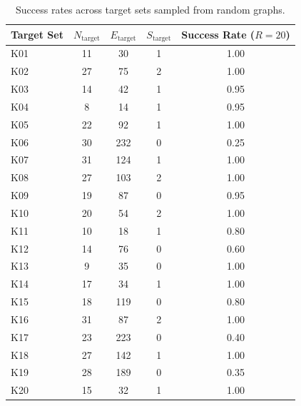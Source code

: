 \begin{table}[ht]
\centering
\caption{Success rates across target sets sampled from random graphs.}
\label{tab:success_rates}
\begin{tabular}{lccc|c}
\toprule
\textbf{Target Set} & \(N_{\text{target}}\) & \(E_{\text{target}}\) & \(S_{\text{target}}\) & \textbf{Success Rate (\(R=20\))} \\
\midrule
K01 & 11 & 30 & 1 & 1.00 \\
K02 & 27 & 75 & 2 & 1.00 \\
K03 & 14 & 42 & 1 & 0.95 \\
K04 & 8 & 14 & 1 & 0.95 \\
K05 & 22 & 92 & 1 & 1.00 \\
K06 & 30 & 232 & 0 & 0.25 \\
K07 & 31 & 124 & 1 & 1.00 \\
K08 & 27 & 103 & 2 & 1.00 \\
K09 & 19 & 87 & 0 & 0.95 \\
K10 & 20 & 54 & 2 & 1.00 \\
K11 & 10 & 18 & 1 & 0.80 \\
K12 & 14 & 76 & 0 & 0.60 \\
K13 & 9 & 35 & 0 & 1.00 \\
K14 & 17 & 34 & 1 & 1.00 \\
K15 & 18 & 119 & 0 & 0.80 \\
K16 & 31 & 87 & 2 & 1.00 \\
K17 & 23 & 223 & 0 & 0.40 \\
K18 & 27 & 142 & 1 & 1.00 \\
K19 & 28 & 189 & 0 & 0.35 \\
K20 & 15 & 32 & 1 & 1.00 \\
\bottomrule
\end{tabular}
\end{table}